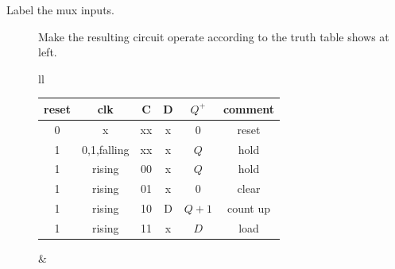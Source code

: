 \begin{description}
\item[Label the mux inputs.]
Make the resulting circuit operate according to the
truth table shows at left.

\begin{tabular}{ll} 
\begin{tabular}{c|c|c|c||c||c}
reset & clk          & C  & D   & $Q^+$  & comment     \\ \hline
0     & x            & xx & x   & $0$    & reset       \\ \hline
1     & 0,1,falling  & xx & x   & $Q$    & hold        \\ \hline
1     & rising       & 00 & x   & $Q$    & hold        \\ \hline
1     & rising       & 01 & x   & 0      & clear       \\ \hline
1     & rising       & 10 & D   & $Q+1$  & count up    \\ \hline
1     & rising       & 11 & x   & $D$    & load        \\ 
\end{tabular}
&
\end{tabular}


\end{description}
